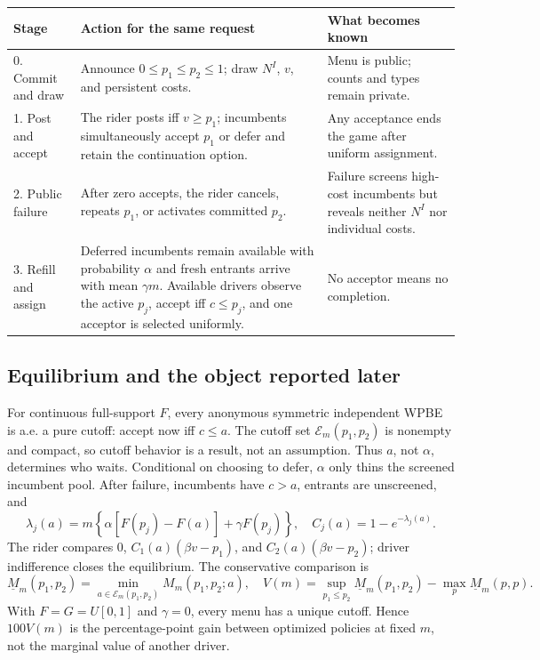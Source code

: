 \documentclass[11pt]{article}
\begin{document}
\begin{center}
\scriptsize
\begin{tabularx}{.99\textwidth}{@{}L{1.55cm}X L{4.25cm}@{}}
\toprule
Stage & Action for the same request & What becomes known\\
. Commit and draw & Announce $0\le p_1\le p_2\le1$; draw $N^I$, $v$, and
persistent costs. & Menu is public; counts and types remain private.\\
1. Post and accept & The rider posts iff $v\ge p_1$; incumbents simultaneously
accept $p_1$ or defer and retain the continuation option. & Any acceptance
ends the game after uniform assignment.\\
2. Public failure & After zero accepts, the rider cancels, repeats $p_1$, or
activates committed $p_2$. & Failure screens high-cost incumbents but reveals
neither $N^I$ nor individual costs.\\
3. Refill and assign & Deferred incumbents remain available with probability
$\alpha$ and fresh entrants arrive with mean $\gamma m$.  Available drivers
observe the active $p_j$, accept iff $c\le p_j$, and one acceptor is selected
uniformly. & No acceptor means no completion.\\
\bottomrule
\end{tabularx}
\end{center}
\vspace{-3pt}

\subsection{Equilibrium and the object reported later}

For continuous full-support $F$, every anonymous symmetric independent WPBE is
a.e. a pure cutoff: accept now iff $c\le a$.  The cutoff set
$\mathcal E_m(p_1,p_2)$ is nonempty and compact, so cutoff behavior is a result,
not an assumption.  Thus $a$, not $\alpha$, determines who waits.  Conditional
on choosing to defer, $\alpha$ only thins the screened incumbent pool.  After
failure, incumbents have $c>a$, entrants are unscreened, and
\[
\lambda_j(a)=m\!\left\{\alpha[F(p_j)-F(a)]+\gamma F(p_j)\right\},\quad
C_j(a)=1-e^{-\lambda_j(a)}.
\]
The rider compares $0$, $C_1(a)(\beta v-p_1)$, and
$C_2(a)(\beta v-p_2)$; driver indifference closes the equilibrium.  The
conservative comparison is
\[
\underline M_m(p_1,p_2)=\min_{a\in\mathcal E_m(p_1,p_2)}M_m(p_1,p_2;a),\quad
V(m)=\sup_{p_1\le p_2}\underline M_m(p_1,p_2)
      -\max_p\underline M_m(p,p).
\]
With $F=G=U[0,1]$ and $\gamma=0$, every menu has a unique cutoff.  Hence
$100V(m)$ is the percentage-point gain between optimized policies at fixed
$m$, not the marginal value of another driver.
\endgroup
\end{document}
